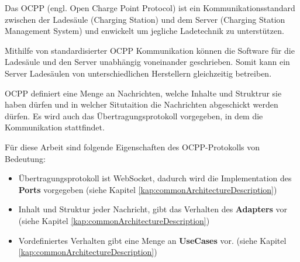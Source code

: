 Das OCPP (engl. Open Charge Point Protocol) ist ein Kommunikationsstandard zwischen der Ladesäule (Charging Station) und dem Server (Charging Station Management System)
und enwickelt um jegliche Ladetechnik zu unterstützen.\cite[Part 0, 3. Seite]{ocppDocs}

Mithilfe von standardisierter OCPP Kommunikation können die Software für die Ladesäule und den Server unabhängig voneinander geschrieben.
Somit kann ein Server Ladesäulen von unterschiedlichen Herstellern gleichzeitig betreiben.

OCPP definiert eine Menge an Nachrichten, welche Inhalte und Struktrur sie haben dürfen und in welcher Situtaition die Nachrichten abgeschickt werden dürfen.
Es wird auch das Übertragungsprotokoll vorgegeben, in dem die Kommunikation stattfindet.

Für diese Arbeit sind folgende Eigenschaften des OCPP-Protokolls von Bedeutung:
\begin{itemize}
    \item Übertragungsprotokoll ist WebSocket, dadurch wird die Implementation des \textbf{Ports} vorgegeben (siehe Kapitel \ref{kap:commonArchitectureDescription})
    \item Inhalt und Struktur jeder Nachricht, gibt das Verhalten des \textbf{Adapters} vor (siehe Kapitel \ref{kap:commonArchitectureDescription})
    \item Vordefiniertes Verhalten gibt eine Menge an \textbf{UseCases} vor. (siehe Kapitel \ref{kap:commonArchitectureDescription})
\end{itemize}